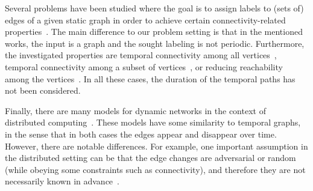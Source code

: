 \documentclass[a4paper,UKenglish,cleveref, autoref, thm-restate]{lipics-v2021}
\begin{document}
Several problems have been studied where the goal is to assign labels to (sets of) edges of a given static graph in order to achieve certain connectivity-related properties~\cite{KlobasMMS22,MertziosMS19,akrida2017complexity,enright2021assigning}. The main difference to our problem setting is that in the mentioned works, the input is a graph and the sought labeling is not periodic. Furthermore, the investigated properties are temporal connectivity among all vertices~\cite{KlobasMMS22,MertziosMS19,akrida2017complexity}, temporal connectivity among a subset of vertices~\cite{KlobasMMS22}, or reducing reachability among the vertices~\cite{enright2021assigning}. In all these cases, the duration of the temporal paths has not been considered.




Finally, there are many models for dynamic networks in the context of distributed computing~\cite{Kuhn2011Dynamic}. 
These models have some similarity to temporal graphs, in the sense that in both cases the edges appear and disappear over time. 
However, there are notable differences. For example, one important assumption in the distributed setting 
can be that the edge changes are adversarial or random (while obeying some constraints such as connectivity), 
and therefore they are not necessarily known in advance~\cite{Kuhn2011Dynamic}. 
\end{document}
